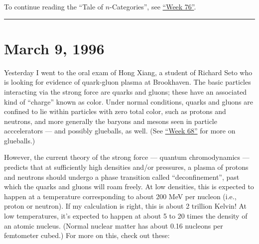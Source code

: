 \documentclass{article}
\renewcommand{\texttt}[1]{%
  \begingroup
  \ttfamily
  \begingroup\lccode`~=`/\lowercase{\endgroup\def~}{/\discretionary{}{}{}}%
  \begingroup\lccode`~=`[\lowercase{\endgroup\def~}{[\discretionary{}{}{}}%
  \begingroup\lccode`~=`.\lowercase{\endgroup\def~}{.\discretionary{}{}{}}%
  \catcode`/=\active\catcode`[=\active\catcode`.=\active
  \scantokens{#1\noexpand}%
  \endgroup
}
\begin{document}
To continue reading the ``Tale of \(n\)-Categories'', see
\protect\hyperlink{week76}{``Week 76''}.

\begin{center}\rule{0.5\linewidth}{0.5pt}\end{center}
\hypertarget{week76}{%
\section{March 9, 1996}\label{week76}}

Yesterday I went to the oral exam of Hong Xiang, a student of Richard
Seto who is looking for evidence of quark-gluon plasma at Brookhaven.
The basic particles interacting via the strong force are quarks and
gluons; these have an associated kind of ``charge'' known as color.
Under normal conditions, quarks and gluons are confined to lie within
particles with zero total color, such as protons and neutrons, and more
generally the baryons and mesons seen in particle acccelerators --- and
possibly glueballs, as well. (See \protect\hyperlink{week68}{``Week
68''} for more on glueballs.)

However, the current theory of the strong force --- quantum
chromodynamics --- predicts that at sufficiently high densities and/or
pressures, a plasma of protons and neutrons should undergo a phase
transition called ``deconfinement'', past which the quarks and gluons
will roam freely. At low densities, this is expected to happen at a
temperature corresponding to about 200 MeV per nucleon (i.e., proton or
neutron). If my calculation is right, this is about 2 trillion Kelvin!
At low temperatures, it's expected to happen at about 5 to 20 times the
density of an atomic nucleus. (Normal nuclear matter has about 0.16
nucleons per femtometer cubed.) For more on this, check out these:

\end{document}
